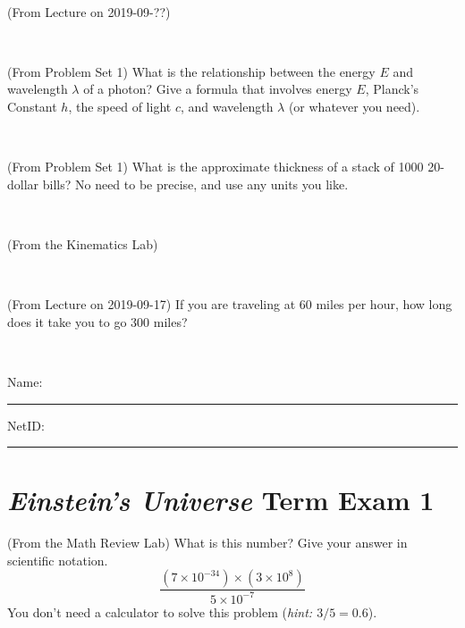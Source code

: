 \documentclass[12pt, letterpaper]{article}
\begin{document}
\vfill ~

\begin{problem} (From Lecture on 2019-09-??)
\end{problem}


\vfill ~


\clearpage


\begin{problem} (From Problem Set 1)
What is the relationship between the energy $E$ and wavelength
$\lambda$ of a photon? Give a formula that involves energy $E$,
Planck's Constant $h$, the speed of light $c$, and wavelength
$\lambda$ (or whatever you need).
\end{problem}

\vfill ~

\begin{problem} (From Problem Set 1)
What is the approximate thickness of a stack of 1000 20-dollar bills?
No need to be precise, and use any units you like.
\end{problem}


\vfill ~

\begin{problem} (From the Kinematics Lab)

\end{problem}


\vfill ~

\begin{problem} (From Lecture on 2019-09-17)
If you are traveling at 60 miles per hour, how long does
it take you to go 300 miles?
\end{problem}


\vfill ~


\cleardoublepage



\noindent
Name: \rule[-1ex]{0.60\textwidth}{0.1pt}
NetID: \rule[-1ex]{0.20\textwidth}{0.1pt}

\section*{\textsl{Einstein's Universe} Term Exam 1}
\setcounter{problem}{1}


\begin{problem} (From the Math Review Lab)
What is this number? Give your answer in scientific notation.
$$
\frac{(7\times10^{-34})\times(3\times10^8)}{5\times10^{-7}}
$$
You don't need a calculator to solve this problem (\textit{hint: $3/5=0.6$}).
\end{problem}
\end{document}
